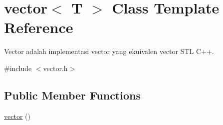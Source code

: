 \hypertarget{classvector}{}\section{vector$<$ T $>$ Class Template Reference}
\label{classvector}


Vector adalah implementasi vector yang ekuivalen vector S\+T\+L C++.  




{\ttfamily \#include $<$vector.\+h$>$}

\subsection*{Public Member Functions}
\begin{DoxyCompactItemize}
\item 
\hypertarget{classvector_a00d237f22fd5eb1aa9a536993e82e54f}{}\hyperlink{classvector_a00d237f22fd5eb1aa9a536993e82e54f}{vector} ()\label{classvector_a00d237f22fd5eb1aa9a536993e82e54f}


\end{DoxyCompactItemize}
